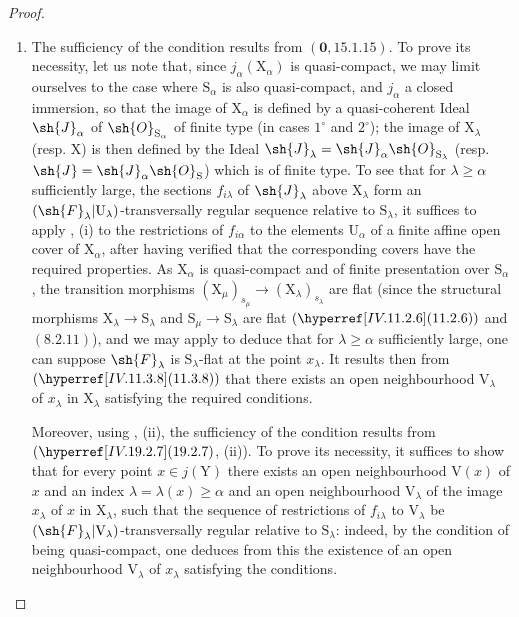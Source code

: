 \begin{proof}
\begin{enumerate}
\item[\rm(i)]
The sufficiency of the condition results from $(\mathbf{0},15.1.15)$. To prove its necessity, let us note that, since $j_\alpha(\mathrm{X}_\alpha)$ is quasi-compact, we may limit ourselves to the case where $\mathrm{S}_\alpha$ is also quasi-compact, and $j_\alpha$ a closed immersion, so that the image of $\mathrm{X}_\alpha$ is defined by a quasi-coherent Ideal $\sh{J}_\alpha$ of $\sh{O}_{\mathrm{S}_\alpha}$ of finite type (in cases $1^\circ$ and $2^\circ$); the image of $\mathrm{X}_\lambda$ (resp. $\mathrm{X}$) is then defined by the Ideal $\sh{J}_\lambda=\sh{J}_\alpha\sh{O}_{\mathrm{S}_\lambda}$ (resp. $\sh{J}=\sh{J}_\alpha\sh{O}_\mathrm{S}$) which is of finite type. To see that for $\lambda\geqslant\alpha$ sufficiently large, the sections $f_{i\lambda}$ of $\sh{J}_\lambda$ above $\mathrm{X}_\lambda$ form an $(\sh{F}_\lambda|\mathrm{U}_\lambda)$-transversally regular sequence relative to $\mathrm{S}_\lambda$, it suffices to apply , (i) to the restrictions of $f_{i\alpha}$ to the elements $\mathrm{U}_\alpha$ of a finite affine open cover of $\mathrm{X}_\alpha$, after having verified that the corresponding covers have the required properties. As $\mathrm{X}_\alpha$ is quasi-compact and of finite presentation over $\mathrm{S}_\alpha$, the transition morphisms $(\mathrm{X}_\mu)_{s_\mu}\to(\mathrm{X}_\lambda)_{s_\lambda}$ are flat (since the structural morphisms $\mathrm{X}_\lambda\to\mathrm{S}_\lambda$ and $\mathrm{S}_\mu\to\mathrm{S}_\lambda$ are flat $(\sref{IV.11.2.6})$ and $(8.2.11)$), and we may apply  to deduce that for $\lambda\geqslant\alpha$ sufficiently large, one can suppose $\sh{F}_\lambda$ is $\mathrm{S}_\lambda$-flat at the point $x_\lambda$. It results then from $(\sref{IV.11.3.8})$ that there exists an open neighbourhood $\mathrm{V}_\lambda$ of $x_\lambda$ in $\mathrm{X}_\lambda$ satisfying the required conditions.

Moreover, using , (ii), the sufficiency of the condition results from $(\sref{IV.19.2.7}$, (ii)). To prove its necessity, it suffices to show that for every point $x\in j(\mathrm{Y})$ there exists an open neighbourhood $\mathrm{V}(x)$ of $x$ and an index $\lambda=\lambda(x)\geqslant\alpha$ and an open neighbourhood $\mathrm{V}_\lambda$ of the image $x_\lambda$ of $x$ in $\mathrm{X}_\lambda$, such that the sequence of restrictions of $f_{i\lambda}$ to $\mathrm{V}_\lambda$ be $(\sh{F}_\lambda|\mathrm{V}_\lambda)$-transversally regular relative to $\mathrm{S}_\lambda$: indeed, by the condition of being quasi-compact, one deduces from this the existence of an open neighbourhood $\mathrm{V}_\lambda$ of $x_\lambda$ satisfying the conditions.


\end{enumerate}
\end{proof}
